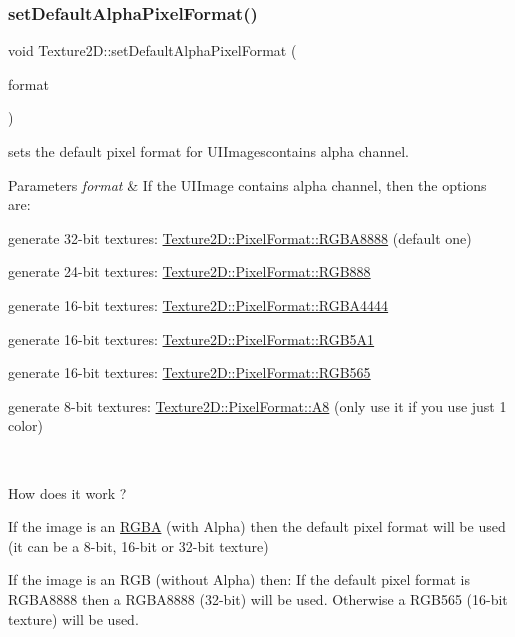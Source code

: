 \subsubsection{\texorpdfstring{set\+Default\+Alpha\+Pixel\+Format()}{setDefaultAlphaPixelFormat()}\hspace{0.1cm}{\footnotesize\ttfamily [1/2]}}
{\footnotesize\ttfamily void Texture2\+D\+::set\+Default\+Alpha\+Pixel\+Format (\begin{DoxyParamCaption}\item[{\hyperlink{classTexture2D_a45d9d8bb5a0669def36bbdfbfb91d220}{Texture2\+D\+::\+Pixel\+Format}}]{format }\end{DoxyParamCaption})\hspace{0.3cm}{\ttfamily [static]}}

sets the default pixel format for U\+I\+Imagescontains alpha channel.


\begin{DoxyParams}{Parameters}
{\em format} & If the U\+I\+Image contains alpha channel, then the options are\+:
\begin{DoxyItemize}
\item generate 32-\/bit textures\+: \hyperlink{classTexture2D_a45d9d8bb5a0669def36bbdfbfb91d220a165f06116e7b8d9b2481dfc805db4619}{Texture2\+D\+::\+Pixel\+Format\+::\+R\+G\+B\+A8888} (default one)
\item generate 24-\/bit textures\+: \hyperlink{classTexture2D_a45d9d8bb5a0669def36bbdfbfb91d220a30ff380a3be74628024063a99fba10f0}{Texture2\+D\+::\+Pixel\+Format\+::\+R\+G\+B888}
\item generate 16-\/bit textures\+: \hyperlink{classTexture2D_a45d9d8bb5a0669def36bbdfbfb91d220a3660a3d64821411531dc60f54cee4f52}{Texture2\+D\+::\+Pixel\+Format\+::\+R\+G\+B\+A4444}
\item generate 16-\/bit textures\+: \hyperlink{classTexture2D_a45d9d8bb5a0669def36bbdfbfb91d220a145a041c8e2080c43fa129fb5b17d8be}{Texture2\+D\+::\+Pixel\+Format\+::\+R\+G\+B5\+A1}
\item generate 16-\/bit textures\+: \hyperlink{classTexture2D_a45d9d8bb5a0669def36bbdfbfb91d220a3b73e4d15701467ed72f157ffaff680a}{Texture2\+D\+::\+Pixel\+Format\+::\+R\+G\+B565}
\item generate 8-\/bit textures\+: \hyperlink{classTexture2D_a45d9d8bb5a0669def36bbdfbfb91d220afd301d675be7b677ba979a430a80c010}{Texture2\+D\+::\+Pixel\+Format\+::\+A8} (only use it if you use just 1 color)
\end{DoxyItemize}\\
\hline
\end{DoxyParams}
How does it work ?
\begin{DoxyItemize}
\item If the image is an \hyperlink{structRGBA}{R\+G\+BA} (with Alpha) then the default pixel format will be used (it can be a 8-\/bit, 16-\/bit or 32-\/bit texture)
\item If the image is an R\+GB (without Alpha) then\+: If the default pixel format is R\+G\+B\+A8888 then a R\+G\+B\+A8888 (32-\/bit) will be used. Otherwise a R\+G\+B565 (16-\/bit texture) will be used.
\end{DoxyItemize}

